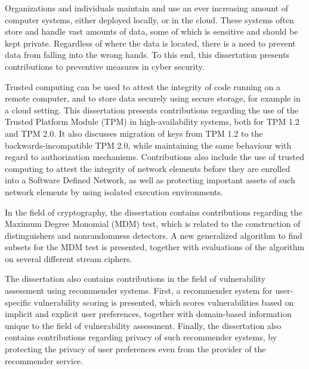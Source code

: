 Organizations and individuals maintain and use an ever increasing amount of computer systems, either deployed locally, or in the cloud.
These systems often store and handle vast amounts of data, some of which is sensitive and should be kept private.
Regardless of where the data is located, there is a need to prevent data from falling into the wrong hands.
To this end, this dissertation presents contributions to preventive measures in cyber security.

Trusted computing can be used to attest the integrity of code running on a remote computer, and to store data securely using secure storage, for example in a cloud setting.
This dissertation presents contributions regarding the use of the Trusted Platform Module (TPM) in high-availability systems, both for TPM 1.2 and TPM 2.0.
It also discusses migration of keys from TPM 1.2 to the backwards-incompatible TPM 2.0, while maintaining the same behaviour with regard to authorization mechanisms.
Contributions also include the use of trusted computing to attest the integrity of network elements before they are enrolled into a Software Defined Network, as well as protecting important assets of such network elements by using isolated execution environments.

In the field of cryptography, the dissertation contains contributions regarding the Maximum Degree Monomial (MDM) test, which is related to the construction of distinguishers and nonrandomness detectors.
A new generalized algorithm to find subsets for the MDM test is presented, together with evaluations of the algorithm on several different stream ciphers.

The dissertation also contains contributions in the field of vulnerability assessment using recommender systems.
First, a recommender system for user-specific vulnerability scoring is presented, which scores vulnerabilities based on implicit and explicit user preferences, together with domain-based information unique to the field of vulnerability assessment.
Finally, the dissertation also contains contributions regarding privacy of such recommender systems, by protecting the privacy of user preferences even from the provider of the recommender service.